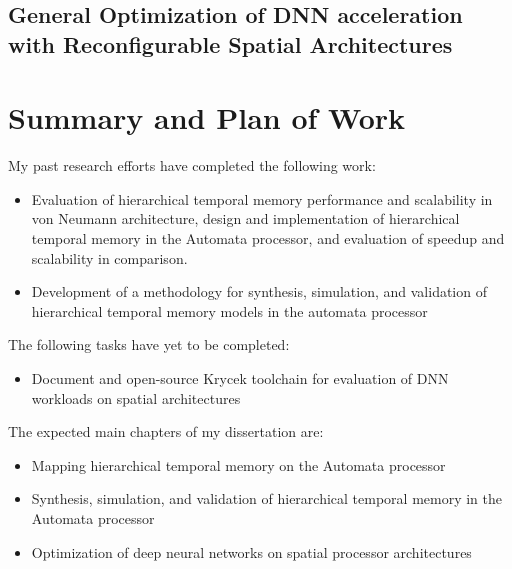 \subsection{General Optimization of DNN acceleration with Reconfigurable Spatial Architectures}

\section{Summary and Plan of Work}

My past research efforts have completed the following work:

\begin{itemize}
    \item Evaluation of hierarchical temporal memory performance and scalability in von Neumann architecture, design and implementation of hierarchical temporal memory in the Automata processor, and evaluation of speedup and scalability in comparison.
    \item Development of a methodology for synthesis, simulation, and validation of hierarchical temporal memory models in the automata processor
\end{itemize}

The following tasks have yet to be completed:

\begin{itemize}
    \item Document and open-source Krycek toolchain for evaluation of DNN workloads on spatial architectures
\end{itemize}

The expected main chapters of my dissertation are:

\begin{itemize}
    \item Mapping hierarchical temporal memory on the Automata processor
    \item Synthesis, simulation, and validation of hierarchical temporal memory in the Automata processor
    \item Optimization of deep neural networks on spatial processor architectures
\end{itemize}
